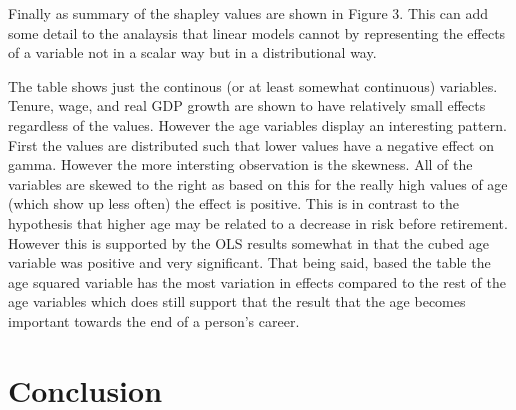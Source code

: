 \documentclass[12pt]{article}
\begin{document}
\begin{onehalfspace}
Finally as summary of the shapley values are shown in Figure 3. This can add some detail to the analaysis that linear models cannot by representing the effects of a variable not in a scalar way but in a distributional way.

The table shows just the continous (or at least somewhat continuous) variables. Tenure, wage, and real GDP growth are shown to have relatively small effects regardless of the values. However the age variables display an interesting pattern. First the values are distributed such that lower values have a negative effect on gamma. However the more intersting observation is the skewness. All of the variables are skewed to the right as based on this for the really high values of age (which show up less often) the effect is positive. This is in contrast to the hypothesis that higher age may be related to a decrease in risk before retirement. However this is supported by the OLS results somewhat in that the cubed age variable was positive and very significant. That being said, based the table the age squared variable has the most variation in effects compared to the rest of the age variables which does still support that the result that the age becomes important towards the end of a person's career.










\section{Conclusion}


\end{onehalfspace}
\end{document}

